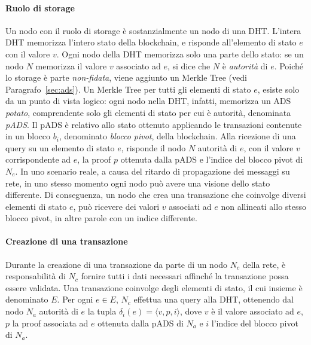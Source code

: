 \paragraph*{Ruolo di storage}
Un nodo con il ruolo di storage è sostanzialmente un nodo di una DHT. L'intera DHT memorizza l'intero stato della blockchain, e risponde all'elemento di stato $e$ con il valore $v$. Ogni nodo della DHT memorizza solo una parte dello stato: se un nodo $N$ memorizza il valore $v$ associato ad $e$, si dice che $N$ è \emph{autorità} di $e$. Poiché lo storage è parte \emph{non-fidata}, viene aggiunto un Merkle Tree (vedi Paragrafo~\ref{sec:ads}). Un Merkle Tree per tutti gli elementi di stato $e$, esiste solo da un punto di vista logico: ogni nodo nella DHT, infatti, memorizza un ADS \emph{potato}, comprendente solo gli elementi di stato per cui è autorità, denominata \emph{pADS}. Il pADS è relativo allo stato ottenuto applicando le transazioni contenute in un blocco $b_i$, denominato \emph{blocco pivot}, della blockchain. Alla ricezione di una query su un elemento di stato $e$, risponde il nodo $N$ autorità di $e$, con il valore $v$ corrispondente ad $e$, la proof $p$ ottenuta dalla pADS e l'indice del blocco pivot di $N_e$.
In uno scenario reale, a causa del ritardo di propagazione dei messaggi su rete, in uno stesso momento ogni nodo può avere una visione dello stato differente. Di conseguenza, un nodo che crea una transazione che coinvolge diversi elementi di stato $e$, può ricevere dei valori $v$ associati ad $e$ non allineati allo stesso blocco pivot, in altre parole con un indice differente.

\paragraph*{Creazione di una transazione}
Durante la creazione di una transazione da parte di un nodo $N_c$ della rete, è responsabilità di $N_c$ fornire tutti i dati necessari affinché la transazione possa essere validata. Una transazione coinvolge degli elementi di stato, il cui insieme è denominato $E$. Per ogni $e \in E$, $N_c$ effettua una query alla DHT, ottenendo dal nodo $N_a$ autorità di $e$ la tupla $\delta_i(e) = \langle v, p, i \rangle$, dove $v$ è il valore associato ad $e$, $p$ la proof associata ad $e$ ottenuta dalla pADS di $N_a$ e $i$ l'indice del blocco pivot di $N_a$.

